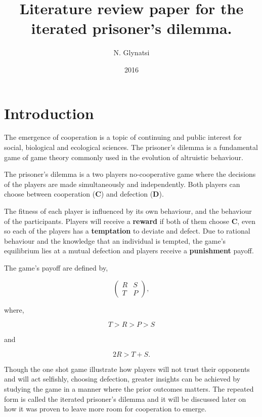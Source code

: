 \documentclass{article}
\title{Literature review paper for the iterated prisoner's dilemma.}
\author{N. Glynatsi}
\date{2016}
\begin{document}
\maketitle

\section{Introduction}\label{section:introduction}

The emergence of cooperation is a topic of continuing and public interest
for social, biological and ecological sciences. The prisoner's dilemma is a 
fundamental game of game theory commonly used in the evolution of altruistic
behaviour.

The prisoner's dilemma is a two players no-cooperative game where the decisions
of the players are made simultaneously and independently. Both players can
choose between cooperation (\textbf{C}) and defection (\textbf{D}).

The fitness of each player is influenced by its own behaviour, and the behaviour
of the participants. Players will receive a \textbf{reward} if both of them choose
\textbf{C}, even so each of the players has a  \textbf{temptation} to deviate and
defect. Due to rational behaviour and the knowledge that an individual is tempted,
the game's equilibrium lies at a mutual defection and players receive a 
\textbf{punishment} payoff.

The game's payoff are  defined by,

\begin{equation} \label{eq:the_pd_payoffs}
	\begin{pmatrix} 
	R & S \\ T & P
	\end{pmatrix},
\end{equation}

where, 

\begin{equation} \label{eq:payoffs_constrain_one}
	T > R > P > S 
\end{equation}

and 

\begin{equation} \label{eq:payoffs_constrain_two}
	2R > T + S.
\end{equation}

Though the one shot game illustrate how  players will not
trust their opponents and  will act selfishly, choosing defection, greater insights
can be achieved by studying the game in a manner where the prior outcomes 
matters. The repeated form is called the iterated prisoner's dilemma and it will
be discussed later on how it was proven to leave more room for cooperation to 
emerge. 
\end{document}

